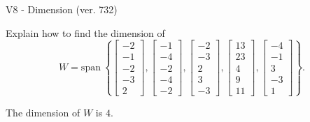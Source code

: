 \begin{exercise}
  \begin{exerciseTitle}V8 - Dimension (ver. 732)\end{exerciseTitle}
  \begin{exerciseStatement}
    Explain how to find the dimension of 
\[W=\mathrm{span}\ \left\{\left[\begin{array}{r}
-2 \\
-1 \\
-2 \\
-3 \\
2
\end{array}\right] , \left[\begin{array}{r}
-1 \\
-4 \\
-2 \\
-4 \\
-2
\end{array}\right] , \left[\begin{array}{r}
-2 \\
-3 \\
2 \\
3 \\
-3
\end{array}\right] , \left[\begin{array}{r}
13 \\
23 \\
4 \\
9 \\
11
\end{array}\right] , \left[\begin{array}{r}
-4 \\
-1 \\
3 \\
-3 \\
1
\end{array}\right]\right\}.\]



  \end{exerciseStatement}
  \begin{exerciseAnswer}
   The dimension of \(W\) is  \(4\).
  


  \end{exerciseAnswer}
\end{exercise}